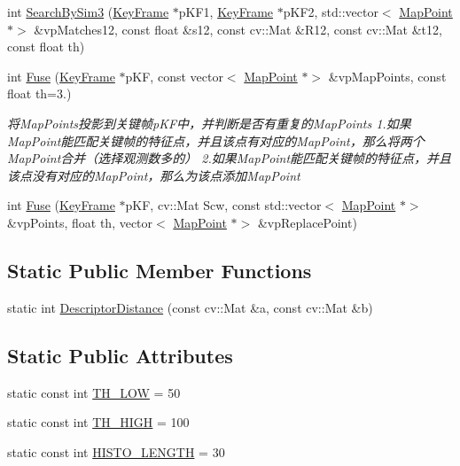 \begin{DoxyCompactItemize}
int \mbox{\hyperlink{class_o_r_b___s_l_a_m2_1_1_o_r_bmatcher_a9b9c641423a8075aa2a6f1d5bab4d211}{Search\+By\+Sim3}} (\mbox{\hyperlink{class_o_r_b___s_l_a_m2_1_1_key_frame}{Key\+Frame}} $\ast$p\+K\+F1, \mbox{\hyperlink{class_o_r_b___s_l_a_m2_1_1_key_frame}{Key\+Frame}} $\ast$p\+K\+F2, std\+::vector$<$ \mbox{\hyperlink{class_o_r_b___s_l_a_m2_1_1_map_point}{Map\+Point}} $\ast$$>$ \&vp\+Matches12, const float \&s12, const cv\+::\+Mat \&R12, const cv\+::\+Mat \&t12, const float th)
\item 
int \mbox{\hyperlink{class_o_r_b___s_l_a_m2_1_1_o_r_bmatcher_add796fcf9f5cae91393d4c0b767e0183}{Fuse}} (\mbox{\hyperlink{class_o_r_b___s_l_a_m2_1_1_key_frame}{Key\+Frame}} $\ast$p\+KF, const vector$<$ \mbox{\hyperlink{class_o_r_b___s_l_a_m2_1_1_map_point}{Map\+Point}} $\ast$$>$ \&vp\+Map\+Points, const float th=3.)
\begin{DoxyCompactList}\small\item\em 将\+Map\+Points投影到关键帧p\+K\+F中，并判断是否有重复的\+Map\+Points 1.如果\+Map\+Point能匹配关键帧的特征点，并且该点有对应的\+Map\+Point，那么将两个\+Map\+Point合并（选择观测数多的） 2.如果\+Map\+Point能匹配关键帧的特征点，并且该点没有对应的\+Map\+Point，那么为该点添加\+Map\+Point \end{DoxyCompactList}\item 
int \mbox{\hyperlink{class_o_r_b___s_l_a_m2_1_1_o_r_bmatcher_a16efd376a838e1edf18c04229b86059d}{Fuse}} (\mbox{\hyperlink{class_o_r_b___s_l_a_m2_1_1_key_frame}{Key\+Frame}} $\ast$p\+KF, cv\+::\+Mat Scw, const std\+::vector$<$ \mbox{\hyperlink{class_o_r_b___s_l_a_m2_1_1_map_point}{Map\+Point}} $\ast$$>$ \&vp\+Points, float th, vector$<$ \mbox{\hyperlink{class_o_r_b___s_l_a_m2_1_1_map_point}{Map\+Point}} $\ast$$>$ \&vp\+Replace\+Point)
\end{DoxyCompactItemize}
\subsection*{Static Public Member Functions}
\begin{DoxyCompactItemize}
\item 
static int \mbox{\hyperlink{class_o_r_b___s_l_a_m2_1_1_o_r_bmatcher_a63ff10561753f23220c2bfcea9b599f3}{Descriptor\+Distance}} (const cv\+::\+Mat \&a, const cv\+::\+Mat \&b)
\end{DoxyCompactItemize}
\subsection*{Static Public Attributes}
\begin{DoxyCompactItemize}
\item 
static const int \mbox{\hyperlink{class_o_r_b___s_l_a_m2_1_1_o_r_bmatcher_a810252607722e100efe4c4e941ae00a6}{T\+H\+\_\+\+L\+OW}} = 50
\item 
static const int \mbox{\hyperlink{class_o_r_b___s_l_a_m2_1_1_o_r_bmatcher_aeb28265794388e19763e9a3dabd51473}{T\+H\+\_\+\+H\+I\+GH}} = 100
\item 
static const int \mbox{\hyperlink{class_o_r_b___s_l_a_m2_1_1_o_r_bmatcher_aa2f2d9094b4f31db4f65c93778f71494}{H\+I\+S\+T\+O\+\_\+\+L\+E\+N\+G\+TH}} = 30
\end{DoxyCompactItemize}

